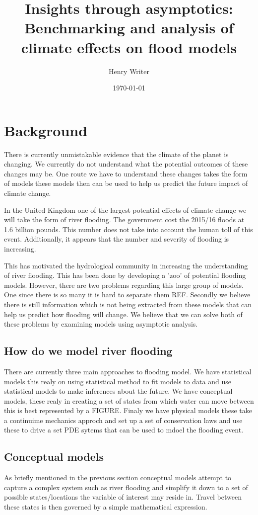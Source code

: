 \documentclass[11pt]{article}
\title{\Huge\textbf{Insights through asymptotics:}\\
 \LARGE Benchmarking and analysis of climate effects on flood models}
\author{Henry Writer }
\date{\today}
\begin{document}
\maketitle

\section{Background}

There is currently unmistakable evidence that the climate of the planet is changing. We currently do not understand what the potential outcomes of these changes may be. One route we have to understand these changes takes the form of models these models then can be used to help us predict the future impact of climate change.

In the United Kingdom one of the largest potential effects of climate change we will take the form of river flooding. The government cost the 2015/16 floods at 1.6 billion pounds. This number does not take into account the human toll of this event. Additionally, it appears that the number and severity of flooding is increasing. 

This has motivated the hydrological community in increasing the understanding of river flooding. This has been done by developing a 'zoo' of potential flooding models. However, there are two problems regarding this large group of models. One since there is so many it is hard to separate them REF. 
Secondly we believe there is still information which is not being extracted from these models that can help us predict how flooding will change. We believe that we can solve both of these problems by examining models using asymptotic analysis.

\subsection{How do we model river flooding}
There are currently three main approaches to flooding model. We have statistical models this realy on using statistical method to fit models to data and use statistical models to make inferences about the future. 
We have conceptual models, these realy in creating a set of states from which water can move between this is best represented by a FIGURE. 
Finaly we have physical models these take a continuime mechanics approch and set up a set of conservation laws and use these to drive a set PDE sytems that can be used to mdoel the flooding event.

\subsection{Conceptual models}
As briefly mentioned in the previous section conceptual models attempt to capture a complex system such as river flooding and simplify it down to a set of possible states/locations the variable of interest may reside in. Travel between these states is then governed by a simple mathematical expression.
\end{document}
